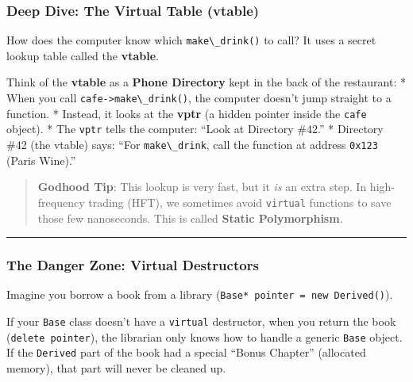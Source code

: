 \hypertarget{deep-dive-the-virtual-table-vtable}{%
\subsubsection{Deep Dive: The Virtual Table
(vtable)}\label{deep-dive-the-virtual-table-vtable}}

How does the computer know which \passthrough{\lstinline!make\_drink()!}
to call? It uses a secret lookup table called the \textbf{vtable}.

Think of the \textbf{vtable} as a \textbf{Phone Directory} kept in the
back of the restaurant: * When you call
\passthrough{\lstinline!cafe->make\_drink()!}, the computer doesn't jump
straight to a function. * Instead, it looks at the \textbf{vptr} (a
hidden pointer inside the \passthrough{\lstinline!cafe!} object). * The
\passthrough{\lstinline!vptr!} tells the computer: ``Look at Directory
\#42.'' * Directory \#42 (the vtable) says: ``For
\passthrough{\lstinline!make\_drink!}, call the function at address
\passthrough{\lstinline!0x123!} (Paris Wine).''

\begin{quote}
\textbf{Godhood Tip}: This lookup is very fast, but it \emph{is} an
extra step. In high-frequency trading (HFT), we sometimes avoid
\passthrough{\lstinline!virtual!} functions to save those few
nanoseconds. This is called \textbf{Static Polymorphism}.
\end{quote}

\begin{center}\rule{0.5\linewidth}{0.5pt}\end{center}

\hypertarget{the-danger-zone-virtual-destructors}{%
\subsubsection{The Danger Zone: Virtual
Destructors}\label{the-danger-zone-virtual-destructors}}

Imagine you borrow a book from a library
(\passthrough{\lstinline!Base* pointer = new Derived()!}).

If your \passthrough{\lstinline!Base!} class doesn't have a
\passthrough{\lstinline!virtual!} destructor, when you return the book
(\passthrough{\lstinline!delete pointer!}), the librarian only knows how
to handle a generic \passthrough{\lstinline!Base!} object. If the
\passthrough{\lstinline!Derived!} part of the book had a special ``Bonus
Chapter'' (allocated memory), that part will never be cleaned up.

